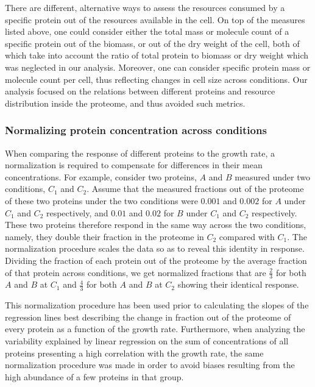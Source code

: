 \documentclass[notitlepage]{article}
\begin{document}
There are different, alternative ways to assess the resources consumed by a specific protein out of the resources available in the cell.
On top of the measures listed above, one could consider either the total mass or molecule count of a specific protein out of the biomass, or out of the dry weight of the cell, both of which take into account the ratio of total protein to biomass or dry weight which was neglected in our analysis.
Moreover, one can consider specific protein mass or molecule count per cell, thus reflecting changes in cell size across conditions.
Our analysis focused on the relations between different proteins and resource distribution inside the proteome, and thus avoided such metrics.
\subsubsection{Normalizing protein concentration across conditions}
\label{concacrossconds}
When comparing the response of different proteins to the growth rate, a normalization is required to compensate for differences in their mean concentrations.
For example, consider two proteins, $A$ and $B$ measured under two conditions, $C_1$ and $C_2$.
Assume that the measured fractions out of the proteome of these two proteins under the two conditions were $0.001$ and $0.002$ for $A$ under $C_1$ and $C_2$ respectively, and $0.01$ and $0.02$ for $B$ under $C_1$ and $C_2$ respectively.
These two proteins therefore respond in the same way across the two conditions, namely, they double their fraction in the proteome in $C_2$ compared with $C_1$.
The normalization procedure scales the data so as to reveal this identity in response.
Dividing the fraction of each protein out of the proteome by the average fraction of that protein across conditions, we get normalized fractions that are $\frac{2}{3}$ for both $A$ and $B$ at $C_1$ and $\frac{4}{3}$ for both $A$ and $B$ at $C_2$ showing their identical response.

This normalization procedure has been used prior to calculating the slopes of the regression lines best describing the change in fraction out of the proteome of every protein as a function of the growth rate.
Furthermore, when analyzing the variability explained by linear regression on the sum of concentrations of all proteins presenting a high correlation with the growth rate, the same normalization procedure was made in order to avoid biases resulting from the high abundance of a few proteins in that group.
\end{document}
